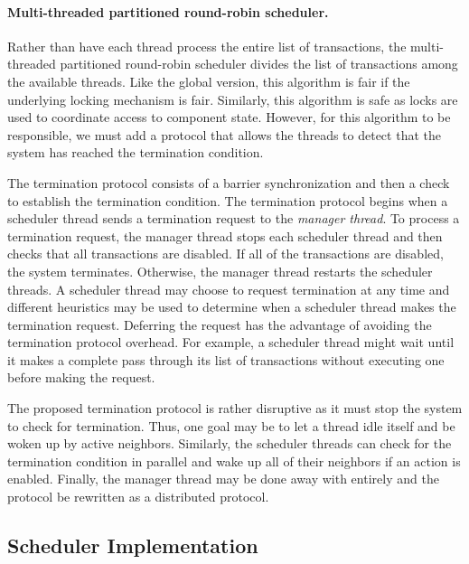 \paragraph{Multi-threaded partitioned round-robin scheduler.}
Rather than have each thread process the entire list of transactions, the multi-threaded partitioned round-robin scheduler divides the list of transactions among the available threads.
Like the global version, this algorithm is fair if the underlying locking mechanism is fair.
Similarly, this algorithm is safe as locks are used to coordinate access to component state.
However, for this algorithm to be responsible, we must add a protocol that allows the threads to detect that the system has reached the termination condition.

The termination protocol consists of a barrier synchronization and then a check to establish the termination condition.
The termination protocol begins when a scheduler thread sends a termination request to the \emph{manager thread}.
To process a termination request, the manager thread stops each scheduler thread and then checks that all transactions are disabled.
If all of the transactions are disabled, the system terminates.
Otherwise, the manager thread restarts the scheduler threads.
A scheduler thread may choose to request termination at any time and different heuristics may be used to determine when a scheduler thread makes the termination request.
Deferring the request has the advantage of avoiding the termination protocol overhead.
For example, a scheduler thread might wait until it makes a complete pass through its list of transactions without executing one before making the request.

The proposed termination protocol is rather disruptive as it must stop the system to check for termination.
Thus, one goal may be to let a thread idle itself and be woken up by active neighbors.
Similarly, the scheduler threads can check for the termination condition in parallel and wake up all of their neighbors if an action is enabled.
Finally, the manager thread may be done away with entirely and the protocol be rewritten as a distributed protocol.

\subsection{Scheduler Implementation}

